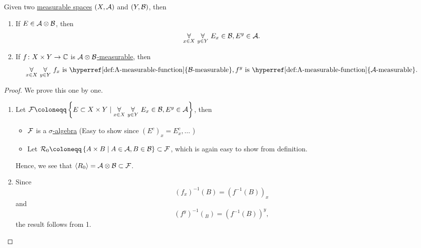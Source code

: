 \begin{proposition}
	Given two \hyperref[def:measurable-space]{measurable spaces} \((X, \mathcal{\MakeUppercase{a}} )\) and \((Y, \mathcal{\MakeUppercase{b}} )\), then
	\begin{enumerate}
		\item If \(E\in \mathcal{\MakeUppercase{a}} \otimes \mathcal{\MakeUppercase{b}}\), then
		      \[
			      \underset{x\in X}{\forall }\ \underset{y\in Y}{\forall }\ E_x\in \mathcal{\MakeUppercase{b}} , E^y\in \mathcal{\MakeUppercase{a}}.
		      \]
		\item If \(f\colon X\times Y\to \mathbb{\MakeUppercase{c}} \) is \hyperref[def:A-measurable-function]{\(\mathcal{\MakeUppercase{a}} \otimes \mathcal{\MakeUppercase{b}} \)-measurable}, then
		      \[
			      \underset{x\in X}{\forall }\ \underset{y\in Y}{\forall }\ f_x \text{ is \hyperref[def:A-measurable-function]{\(\mathcal{\MakeUppercase{b}}\)-measurable}}, f^y \text{ is \hyperref[def:A-measurable-function]{\(\mathcal{\MakeUppercase{a}}\)-measurable}}.
		      \]
	\end{enumerate}
\end{proposition}
\begin{proof}
	We prove this one by one.
	\begin{enumerate}
		\item Let \(\mathcal{\MakeUppercase{f}} \coloneqq \left\{E\subset X\times Y \mid \underset{x\in X}{\forall }\ \underset{y\in Y}{\forall }\ E_x\in \mathcal{\MakeUppercase{b}} , E^y\in \mathcal{\MakeUppercase{a}}\right\}\), then
		      \begin{itemize}
			      \item \(\mathcal{\MakeUppercase{f}} \) is a \hyperref[def:sigma-algebra]{\(\sigma\)-algebra} (Easy to show since \((E^{c} )_x = E_{x}^{c} , \ldots  \) )
			      \item Let \(\mathcal{\MakeUppercase{r}} _0 \coloneqq \left\{A\times B \mid A\in \mathcal{\MakeUppercase{a}} , B\in \mathcal{\MakeUppercase{b}} \right\}\subset \mathcal{\MakeUppercase{f}}\), which is again
			            easy to show from definition.
		      \end{itemize}
		      Hence, we see that \(\left< R_0 \right> = \mathcal{\MakeUppercase{a}} \otimes \mathcal{\MakeUppercase{b}} \subset \mathcal{\MakeUppercase{f}} \).
		\item Since
		      \[
			      (f_{x} )^{-1} (B) = (f^{-1} (B))_{x}
		      \]
		      and
		      \[
			      (f^{y} )^{-1} (_{B} ) = (f^{-1} (B))^{y},
		      \]
		      the result follows from 1.
	\end{enumerate}
\end{proof}

